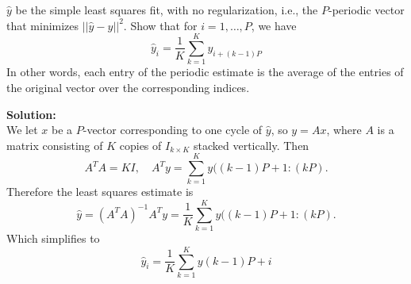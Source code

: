 \begin{enumerate}[label=(\alph*)]
	      $\hat{y}$ be the simple least squares fit, with no regularization,
	      i.e., the $P$-periodic vector that minimizes $||\hat{y} - y||^2$.
	      Show that for $i = 1, \ldots, P$, we have
	      $$ \hat{y}_i = \frac{1}{K} \sum_{k=1}^K y_{i + (k-1)P} $$
	      In other words, each entry of the periodic estimate is the average of
	      the entries of the original vector over the corresponding indices.
	      \begin{tcolorbox}
		      \textbf{Solution:} \\
		      We let $x$ be a $P$-vector corresponding to one cycle of
		      $\hat{y}$, so $y = Ax$, where $A$ is a matrix consisting of $K$
		      copies of $I_{k \times K}$ stacked vertically. Then
		      $$
			      A^T A = K I, \quad A^T y = \sum_{k=1}^K y((k - 1)
			      P + 1 : (kP).
		      $$
		      Therefore the least squares estimate is
		      $$
			      \hat{y} = (A^TA)^{-1}A^Ty =\frac{1}{K} \sum_{k=1}^K y((k - 1) P + 1 : (kP).
		      $$
		      Which simplifies to
		      $$
			      \hat{y}_i = \frac{1}{K} \sum_{k=1}^K y(k - 1) P + i
		      $$
	      \end{tcolorbox}
\end{enumerate}
